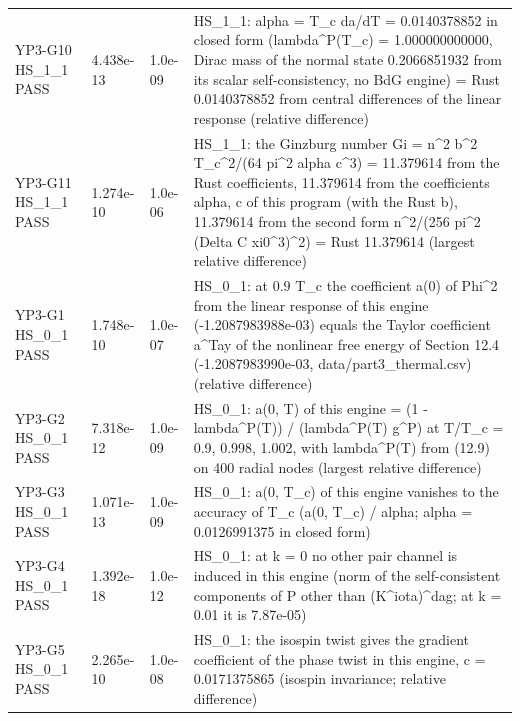 \documentclass[aps,prd,onecolumn,superscriptaddress,nofootinbib,floatfix,longbibliography]{revtex4-2}
\begin{document}
\begin{longtable}{p{}p{}p{}p{}}
YP3-G10 HS\_1\_1 \newline PASS & 4.438e-13 & 1.0e-09 & HS\_1\_1: alpha = T\_c da/dT = 0.0140378852 in closed form (lambda\textasciicircum{}P(T\_c) = 1.000000000000, Dirac mass of the normal state 0.2066851932 from its scalar self-consistency, no BdG engine) = Rust 0.0140378852 from central differences of the linear response (relative difference) \\
YP3-G11 HS\_1\_1 \newline PASS & 1.274e-10 & 1.0e-06 & HS\_1\_1: the Ginzburg number Gi = n\textasciicircum{}2 b\textasciicircum{}2 T\_c\textasciicircum{}2/(64 pi\textasciicircum{}2 alpha c\textasciicircum{}3) = 11.379614 from the Rust coefficients, 11.379614 from the coefficients alpha, c of this program (with the Rust b), 11.379614 from the second form n\textasciicircum{}2/(256 pi\textasciicircum{}2 (Delta C xi0\textasciicircum{}3)\textasciicircum{}2) = Rust 11.379614 (largest relative difference) \\
YP3-G1 HS\_0\_1 \newline PASS & 1.748e-10 & 1.0e-07 & HS\_0\_1: at 0.9 T\_c the coefficient a(0) of \textbar{}Phi\textbar{}\textasciicircum{}2 from the linear response of this engine (-1.2087983988e-03) equals the Taylor coefficient a\textasciicircum{}Tay of the nonlinear free energy of Section 12.4 (-1.2087983990e-03, data/part3\_thermal.csv) (relative difference) \\
YP3-G2 HS\_0\_1 \newline PASS & 7.318e-12 & 1.0e-09 & HS\_0\_1: a(0, T) of this engine = (1 - lambda\textasciicircum{}P(T)) / (lambda\textasciicircum{}P(T) g\textasciicircum{}P) at T/T\_c = 0.9, 0.998, 1.002, with lambda\textasciicircum{}P(T) from (12.9) on 400 radial nodes (largest relative difference) \\
YP3-G3 HS\_0\_1 \newline PASS & 1.071e-13 & 1.0e-09 & HS\_0\_1: a(0, T\_c) of this engine vanishes to the accuracy of T\_c (\textbar{}a(0, T\_c)\textbar{} / alpha; alpha = 0.0126991375 in closed form) \\
YP3-G4 HS\_0\_1 \newline PASS & 1.392e-18 & 1.0e-12 & HS\_0\_1: at k = 0 no other pair channel is induced in this engine (norm of the self-consistent components of P other than (K\textasciicircum{}iota)\textasciicircum{}dag; at k = 0.01 it is 7.87e-05) \\
YP3-G5 HS\_0\_1 \newline PASS & 2.265e-10 & 1.0e-08 & HS\_0\_1: the isospin twist gives the gradient coefficient of the phase twist in this engine, c = 0.0171375865 (isospin invariance; relative difference) \\

\end{longtable}
\end{document}
